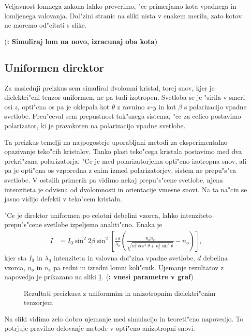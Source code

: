 \documentclass[a4paper,10pt]{article}
\newcommand{\todo}[1]{(\textbf{\textsmaller{TODO}: #1})}
\begin{document}
Veljavnost lomnega zakona lahko preverimo, "ce primerjamo kota vpadnega in lomljenega valovanja. 
Dol"zini stranic na sliki nista v enakem merilu, zato kotov ne moremo od"citati s slike. 

\todo{Simuliraj lom na novo, izracunaj oba kota}


\subsection{Uniformen direktor}
Za naslednji preizkus sem simuliral dvolomni kristal, torej snov, kjer je dielektri"cni tenzor uniformen, ne pa tudi izotropen. 
Svetloba se je "sirila v smeri osi $z$, opti"cna os pa je oklepala kot $\theta$ z ravnino $x$-$y$ in kot $\beta$ s polarizacijo vpadne svetlobe. 
Preu"ceval sem prepustnost tak"snega sistema, "ce za celico postavimo polarizator, ki je pravokoten na polarizacijo vpadne svetlobe. 

Ta preizkus temelji na najpogosteje uporabljani metodi za eksperimentalno opazivanje teko"cih kristalov. 
Tanko plast teko"cega kristala postavimo med dva prekri"zana polarizatorja. 
"Ce je med polarizatorjema opti"cno izotropna snov, ali pa je opti"cna os vzporedna z enim izmed polarizatorjev, sistem ne prepu"s"ca svetlobe. 
V ostalih primerih pa vidimo nekaj prepu"s"cene svetlobe, njena intenziteta je odvisna od dvolomnosti in orientacije vmesne snovi. 
Na ta na"cin se jasno vidijo defekti v teko"cem kristalu. 

"Ce je direktor uniformen po celotni debelini vzorca, lahko intenziteto prepu"s"cene svetlobe izpeljemo analiti"cno\cite{kleman}. Enaka je
\begin{align}
 I &= I_0 \sin^2 2\beta \sin^2 \left[ \frac{\pi d}{\lambda_0} \left( \frac{n_o n_e}{\sqrt{n_e^2 \cos^2 \theta + n_0^2 \sin^2 \theta}} - n_o \right)\right],
\end{align}
kjer sta $I_0$ in $\lambda_0$ intenziteta in valovna dol"zina vpadne svetlobe, $d$ debelina vzorca, $n_o$ in $n_e$ pa redni in izredni lomni koli"cnik. 
Ujemanje rezultatov z napovedjo je prikazano na sliki \ref{fig:test-uniform}.
\todo{vnesi parametre v graf}

\begin{figure}[h]
 
 \caption{Rezultati preizkusa z uniformnim in anizotropnim dielektri"cnim tenzorjem}
 \label{fig:test-uniform}
\end{figure}

Na sliki vidimo zelo dobro ujemanje med simulacijo in teoreti"cno napovedjo. 
To potrjuje pravilno delovanje metode v opti"cno anizotropni snovi. 
\end{document}
